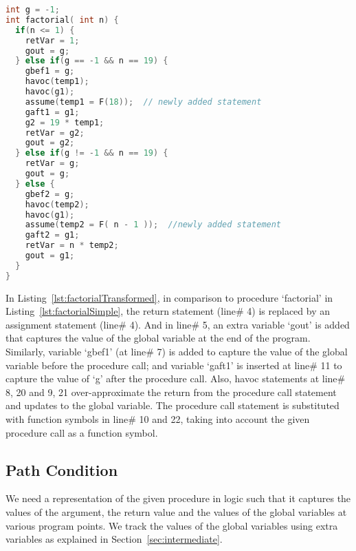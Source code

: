 \documentclass{llncs}
\newcommand{\foo}{\textit{foo}}
\newcommand{\pathCondition}{\mathit{T_{\foo}}}
\begin{document}
\begin{lstlisting}[language=c, caption= {Procedure `factorial' from
      Listing~\ref{lst:factorialSimple} converted to the form our
      approach expects}, label=lst:factorialTransformed]
int g = -1;
int factorial( int n) {
  if(n <= 1) {
    retVar = 1;
    gout = g;
  } else if(g == -1 && n == 19) {
    gbef1 = g;
    havoc(temp1); 
    havoc(g1);
    assume(temp1 = F(18));  // newly added statement
    gaft1 = g1;
    g2 = 19 * temp1;
    retVar = g2;
    gout = g2;
  } else if(g != -1 && n == 19) {
    retVar = g;
    gout = g;
  } else {
    gbef2 = g;
    havoc(temp2);
    havoc(g1);
    assume(temp2 = F( n - 1 ));  //newly added statement
    gaft2 = g1;
    retVar = n * temp2;
    gout = g1;
  }
}
\end{lstlisting}

In Listing~\ref{lst:factorialTransformed}, in comparison to procedure
`factorial' in Listing~\ref{lst:factorialSimple}, the return statement
(line\# 4) is replaced by an assignment statement (line\# 4). And in
line\# 5, an extra variable `gout' is added that captures the value of
the global variable at the end of the program. Similarly, variable
`gbef1' (at line\# 7) is added to capture the value of the global
variable before the procedure call; and variable `gaft1' is inserted
at line\# 11 to capture the value of `g' after the procedure
call. Also, havoc statements at line\# 8, 20 and 9, 21 over-approximate
the return from the procedure call statement and updates to the global
variable. The procedure call statement is substituted with function
symbols in line\# 10 and 22, taking into account the given procedure
call as a function symbol.

\subsection{Path Condition}


We need a representation of the given procedure in logic such that it
captures the values of the argument, the return value and the values
of the global variables at various program points. We track the values
of the global variables using extra variables as explained in
Section~\ref{sec:intermediate}.
\end{document}
